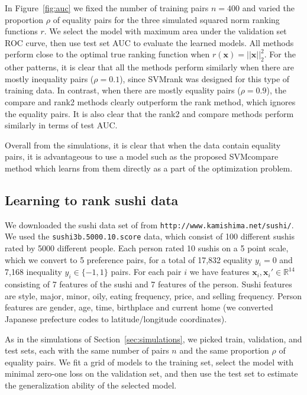 \documentclass[twoside,11pt]{article}
\newcommand{\changed}[1]{
  #1
}
\newcommand{\RR}{\mathbb R}
\begin{document}
In Figure~\ref{fig:auc} we fixed the number of training pairs $n=400$
and varied the proportion $\rho$ of equality pairs for the three
simulated squared norm ranking functions $r$. We select the model with
maximum area under the validation set ROC curve, then use test set AUC
to evaluate the learned models. All methods perform close to the
optimal true ranking function when $r(\mathbf x)=||\mathbf
x||^2_2$. For the other patterns, it is clear that all the methods
perform similarly when there are mostly inequality pairs ($\rho=0.1$),
since SVMrank was designed for this type of training data. In
contrast, when there are mostly equality pairs ($\rho=0.9$), the
compare and rank2 methods clearly outperform the rank method, which
ignores the equality pairs. \changed{It is also clear that the rank2 and
compare methods perform similarly in terms of test AUC.}

\changed{Overall from the simulations, it is clear that when the data contain
equality pairs, it is advantageous to use a model such as the proposed
SVMcompare method which learns from them directly as a part of the
optimization problem.}

\subsection{Learning to rank sushi data}

We downloaded the sushi data set of \citet{object-ranking-methods}
from \texttt{http://www.kamishima.net/sushi/}. We used the
\texttt{sushi3b.5000.10.score} data, which consist of 100 different
sushis rated by 5000 different people. Each person rated 10 sushis on
a 5 point scale, which we convert to 5 preference pairs, for a total
of 17,832 equality $y_i=0$ and 7,168 inequality $y_i\in\{-1,1\}$
pairs. For each pair $i$ we have features $\mathbf x_i,\mathbf
x_i'\in\RR^{14}$ consisting of 7 features of the sushi and 7 features
of the person. Sushi features are style, major, minor, oily, eating
frequency, price, and selling frequency. Person features are gender, age,
time, birthplace and current home (we converted Japanese prefecture
codes to latitude/longitude coordinates).

As in the simulations of Section~\ref{sec:simulations}, we picked
train, validation, and test sets, each with the same number of pairs
$n$ and the same proportion $\rho$ of equality pairs. We fit a grid of
models to the training set, select the model with
minimal zero-one loss on the validation set, and then use the test set
to estimate the generalization ability of the selected model.
\end{document}
